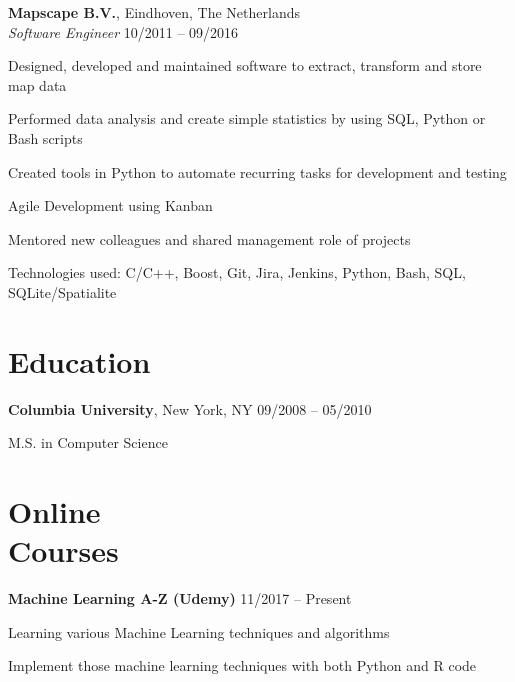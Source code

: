 \documentclass[margin,line]{resume}
\begin{document}
\begin{resume}
    \textbf{Mapscape B.V.}, Eindhoven, The Netherlands \\
    \textsl{Software Engineer} \hfill 10/2011 -- 09/2016 \vspace{-3mm}\\\vspace{-1mm}%
      \begin{list2}
      \item Designed, developed and maintained software to extract, transform and store map data
      \item Performed data analysis and create simple statistics by using SQL, Python or Bash scripts
      \item Created tools in Python to automate recurring tasks for development and testing
      \item Agile Development using Kanban
      \item Mentored new colleagues and shared management role of projects
      \item Technologies used: C/C++, Boost, Git, Jira, Jenkins, Python, Bash, SQL, SQLite/Spatialite
      \end{list2}

    \section{\myheadingstyle Education}

    \textbf{Columbia University}, New York, NY \hfill 09/2008 -- 05/2010 \vspace{-3mm}\\\vspace{-1mm}%
      \begin{list2}
       \item M.S. in Computer Science
      \end{list2}
    \vspace{-1mm}
 
    \section{\myheadingstyle Online \\ Courses}

    \textbf{Machine Learning A-Z (Udemy)} \hfill 11/2017 -- Present \vspace{-3mm}\\\vspace{-1mm}%
      \begin{list2}
       \item Learning various Machine Learning techniques and algorithms
       \item Implement those machine learning techniques with both Python and R code
      \end{list2}
    \vspace{-2mm}


\end{resume}
\end{document}
